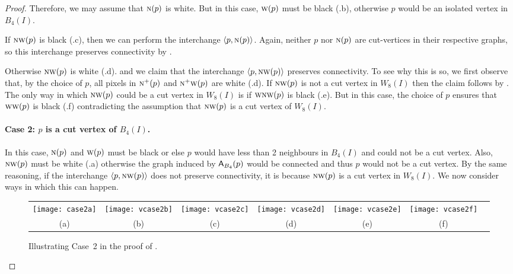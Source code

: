 \documentclass[lotsofwhite,charterfonts]{patmorin}
\newcommand{\N}{\textsc{n}}
\newcommand{\W}{\textsc{w}}
\newcommand{\NW}{\textsc{nw}}
\newcommand{\ic}[2]{\langle #1,#2 \rangle}
\newcommand{\A}[2]{\ensuremath{\protect\textup{\textsf{A}}_{#2}(#1)}}
\begin{document}
\begin{proof}
Therefore, we may assume that $\N(p)$ is white.  But in this case,
$\W(p)$ must be black (.b), otherwise $p$ would be an isolated vertex in $B_4(I)$.

If $\NW(p)$ is black (.c), then we can perform the
interchange $\ic{p}{\N(p)}$.  Again, neither $p$ nor $\N(p)$ are
cut-vertices in their respective graphs, so this interchange preserves
connectivity by .

Otherwise $\NW(p)$ is white (.d). and we claim that
the interchange $\ic{p}{\NW(p)}$ preserves connectivity. To see
why this is so, we first observe that, by the choice of $p$, all
pixels in $\N^+(p)$ and $\N^+\W(p)$ are white (.d). If $\NW(p)$ is not a cut vertex in $W_8(I)$ then the claim follows by .  The only way in which $\NW(p)$ could be a cut vertex in $W_8(I)$ is if $\W\NW(p)$ is black (.e). But in this case, the choice of $p$ ensures that $\W\W(p)$ is black (.f) contradicting the assumption that  $\NW(p)$ is a cut vertex of $W_8(I)$.

\paragraph{Case 2: $p$ is a cut vertex of $B_4(I)$.} In this case,
$\N(p)$ and $\W(p)$ must be black or else $p$ would have less than
2 neighbours in $B_4(I)$ and could not be a cut vertex.  Also,
$\NW(p)$ must be white (.a) otherwise the graph induced by \A{p}{B_4} would be connected and thus $p$ would not be a cut vertex. By the same reasoning, if the interchange $\ic{p}{\NW(p)}$ does not preserve connectivity, it is because $\NW(p)$ is a cut vertex in $W_8(I)$.  We now consider ways in which this can happen.

\begin{figure}[htbp]
\begin{center}
\begin{tabular}{ccccccc}
\texttt{[image: case2a]} & 
\texttt{[image: vcase2b]} & 
\texttt{[image: vcase2c]} & 
\texttt{[image: vcase2d]} & 
\texttt{[image: vcase2e]} & 
\texttt{[image: vcase2f]} \\
(a) & (b) & (c) & (d) & (e) & (f)
\end{tabular}
\end{center}
\caption{Illustrating Case~2 in the proof of .}
\end{figure}


\end{proof}
\end{document}
